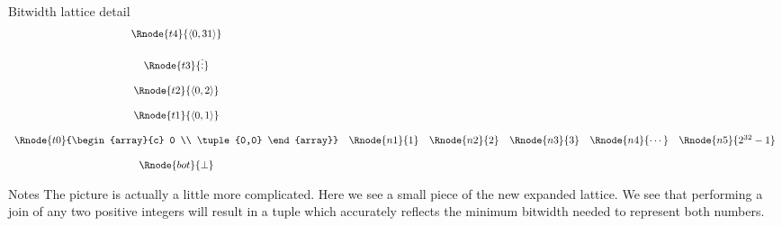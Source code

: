 \documentclass[%
pdf,
colorBG,
slideColor,
nototal,
oqe
]{prosper}
\newenvironment{talknotes}{\begin{slide}{Notes}\tiny}{\end{slide}}
\begin{document}
\begin{slide}{Bitwidth lattice detail}
\begin{displaymath}
\begin{array}{cccccc}
\Rnode{t4}{\tuple{0,31}}\\ \\
\Rnode{t3}{\vdots}\\ \\
\Rnode{t2}{\tuple{0,2}}\\ \\
\Rnode{t1}{\tuple{0,1}}\\ \\
\Rnode{t0}{\begin{array}{c} 0 \\ \tuple{0,0} \end{array}} &
\Rnode{n1}{1} &
\Rnode{n2}{2} &
\Rnode{n3}{3} &
\Rnode{n4}{\cdots} &
\Rnode{n5}{2^{32}-1} \\ \\
\Rnode{bot}{\bot} \\
\end{array}
\end{displaymath}
\ifDVItoPS\else{}\fi
{}

\end{slide}

\begin{talknotes}
The picture is actually a little more complicated.  Here we see
a small piece of the new expanded lattice.  We see that performing a
join of any two positive integers will result in a tuple which
accurately reflects the minimum bitwidth needed to represent both
numbers.
\end{talknotes}
\end{document}
